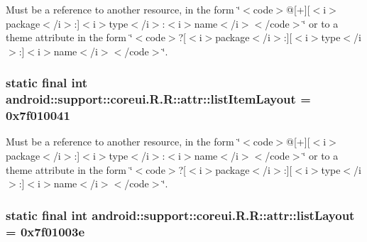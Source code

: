 Must be a reference to another resource, in the form \char`\"{}$<$code$>$@\mbox{[}+\mbox{]}\mbox{[}$<$i$>$package$<$/i$>$:\mbox{]}$<$i$>$type$<$/i$>$:$<$i$>$name$<$/i$>$$<$/code$>$\char`\"{} or to a theme attribute in the form \char`\"{}$<$code$>$?\mbox{[}$<$i$>$package$<$/i$>$:\mbox{]}\mbox{[}$<$i$>$type$<$/i$>$:\mbox{]}$<$i$>$name$<$/i$>$$<$/code$>$\char`\"{}. \hypertarget{classandroid_1_1support_1_1coreui_1_1_r_1_1attr_ec231a739d8da73994d4e51b5908fd11}{
\subsubsection[{listItemLayout}]{\setlength{\rightskip}{0pt plus 5cm}static final int android::support::coreui.R.R::attr::listItemLayout = 0x7f010041}}
\label{classandroid_1_1support_1_1coreui_1_1_r_1_1attr_ec231a739d8da73994d4e51b5908fd11}


Must be a reference to another resource, in the form \char`\"{}$<$code$>$@\mbox{[}+\mbox{]}\mbox{[}$<$i$>$package$<$/i$>$:\mbox{]}$<$i$>$type$<$/i$>$:$<$i$>$name$<$/i$>$$<$/code$>$\char`\"{} or to a theme attribute in the form \char`\"{}$<$code$>$?\mbox{[}$<$i$>$package$<$/i$>$:\mbox{]}\mbox{[}$<$i$>$type$<$/i$>$:\mbox{]}$<$i$>$name$<$/i$>$$<$/code$>$\char`\"{}. \hypertarget{classandroid_1_1support_1_1coreui_1_1_r_1_1attr_60f33257a79e512885e9cea3c7c982a7}{
\subsubsection[{listLayout}]{\setlength{\rightskip}{0pt plus 5cm}static final int android::support::coreui.R.R::attr::listLayout = 0x7f01003e}}
\label{classandroid_1_1support_1_1coreui_1_1_r_1_1attr_60f33257a79e512885e9cea3c7c982a7}


